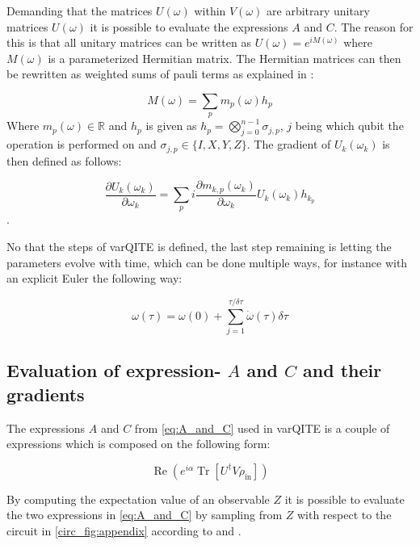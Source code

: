 \documentclass[../main.tex]{subfiles}
\begin{document}
Demanding that the matrices $U(\omega)$ within  $V(\omega)$ are arbitrary unitary matrices $U(\omega)$ it is possible to evaluate the expressions $A$ and $C$. The reason for this is that all unitary matrices can be written as $U(\omega)=e^{i M(\omega)}$ where $M(\omega)$ is a parameterized Hermitian matrix. The Hermitian matrices can then be rewritten as weighted sums of pauli terms as explained in \cite{VQB:litteraturelist}:

\begin{equation}
M(\omega)=\sum_{p} m_{p}(\omega) h_{p}
\end{equation}
Where $m_{p}(\omega) \in \mathbb{R}$ and $h_p$ is given as $h_{p}=\bigotimes_{j=0}^{n-1} \sigma_{j, p}$, $j$ being which qubit the operation is performed on and $\sigma_{j, p} \in\{I, X, Y, Z\}$. The gradient of $U_k(\omega_k)$ is then defined as follows:

\begin{equation}
\frac{\partial U_{k}\left(\omega_{k}\right)}{\partial \omega_{k}}=\sum_{p} i \frac{\partial m_{k, p}\left(\omega_{k}\right)}{\partial \omega_{k}} U_{k}\left(\omega_{k}\right) h_{k_{p}}
\end{equation}.

No that the steps of varQITE is defined, the last step remaining is letting the parameters evolve with time, which can be done multiple ways, for instance with an explicit Euler the following way:

\begin{equation}
\omega(\tau)=\omega(0)+\sum_{j=1}^{\tau / \delta \tau} \dot{\omega}(\tau) \delta \tau
\end{equation}

\subsection{Evaluation of expression- $A$ and $C$ and their gradients}
The expressions $A$ and $C$ from \autoref{eq:A_and_C} used in varQITE is a couple of expressions which is composed on the following form:

\begin{equation}
\operatorname{Re}\left(e^{i \alpha} \operatorname{Tr}\left[U^{\dagger} V \rho_{\mathrm{in}}\right]\right)
\label{eq:trial_state_basic_form}
\end{equation}

By computing the expectation value of an observable $Z$ it is possible to evaluate the two expressions in \autoref{eq:A_and_C} by sampling from $Z$ with respect to the circuit in \eqref{circ_fig:appendix} according to \cite{VQB:litteraturelist} and \cite{McArdle_2019}\cite{Yuan_2019}\cite{Somma_2002}.
\end{document}

